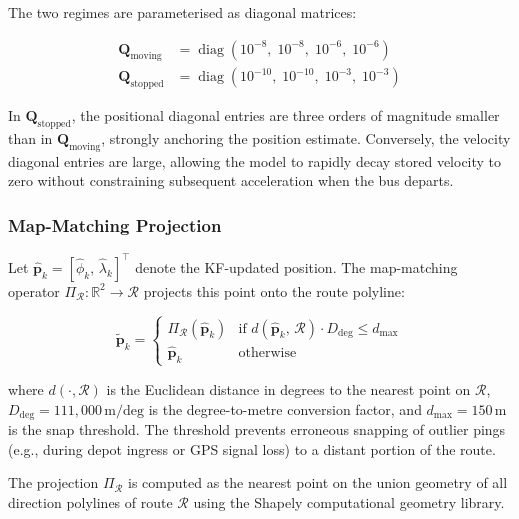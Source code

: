 \documentclass[12pt, a4paper]{article}
\begin{document}
The two regimes are parameterised as diagonal matrices:

\begin{align}
    \mathbf{Q}_{\text{moving}}  &= \operatorname{diag}
        \!\left(10^{-8},\; 10^{-8},\; 10^{-6},\; 10^{-6}\right)
    \label{eq:Q_moving} \\
    \mathbf{Q}_{\text{stopped}} &= \operatorname{diag}
        \!\left(10^{-10},\; 10^{-10},\; 10^{-3},\; 10^{-3}\right)
    \label{eq:Q_stopped}
\end{align}

In $\mathbf{Q}_{\text{stopped}}$, the positional diagonal entries are three
orders of magnitude smaller than in $\mathbf{Q}_{\text{moving}}$, strongly
anchoring the position estimate. Conversely, the velocity diagonal entries are
large, allowing the model to rapidly decay stored velocity to zero without
constraining subsequent acceleration when the bus departs.

\subsubsection{Map-Matching Projection}

Let $\hat{\mathbf{p}}_k = [\hat{\phi}_k,\,\hat{\lambda}_k]^\top$ denote the
KF-updated position. The map-matching operator
$\Pi_{\mathcal{R}} : \mathbb{R}^2 \to \mathcal{R}$ projects this point onto
the route polyline:

\begin{equation}
    \tilde{\mathbf{p}}_k =
    \begin{cases}
        \Pi_{\mathcal{R}}(\hat{\mathbf{p}}_k)
            & \text{if } d\!\left(\hat{\mathbf{p}}_k,\, \mathcal{R}\right)
              \cdot D_{\text{deg}} \leq d_{\max} \\
        \hat{\mathbf{p}}_k & \text{otherwise}
    \end{cases}
    \label{eq:map_match}
\end{equation}

\noindent where $d(\cdot,\mathcal{R})$ is the Euclidean distance in degrees to
the nearest point on $\mathcal{R}$, $D_{\text{deg}} = 111{,}000\,\text{m/deg}$
is the degree-to-metre conversion factor, and $d_{\max} = 150\,\text{m}$ is
the snap threshold. The threshold prevents erroneous snapping of outlier pings
(e.g., during depot ingress or GPS signal loss) to a distant portion of the
route.

The projection $\Pi_{\mathcal{R}}$ is computed as the nearest point on the
union geometry of all direction polylines of route $\mathcal{R}$ using the
Shapely computational geometry library.
\end{document}
